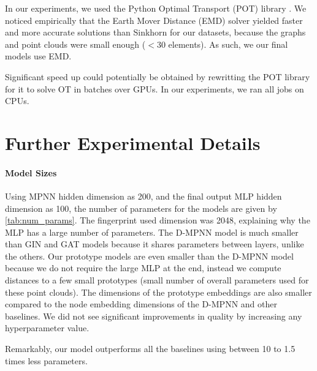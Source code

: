 \documentclass[letterpaper]{article} \usepackage{aaai22}  \usepackage{times}  \usepackage{helvet}  \usepackage{courier}  \usepackage[hyphens]{url}  \usepackage{graphicx} \urlstyle{rm} \def\UrlFont{\rm}  \usepackage{natbib}  \usepackage{caption} \DeclareCaptionStyle{ruled}{labelfont=normalfont,labelsep=colon,strut=off} \frenchspacing  \setlength{\pdfpagewidth}{8.5in}  \setlength{\pdfpageheight}{11in}  \usepackage{algorithm}
\begin{document}
In our experiments, we used the Python Optimal Transport (POT) library \citep{flamary2017pot}. We noticed empirically that the Earth Mover Distance (EMD) solver yielded faster and more accurate solutions than Sinkhorn for our datasets, because the graphs and point clouds were small enough ($< 30$ elements). As such, we our final models use EMD.

Significant speed up could potentially be obtained by rewritting the POT library for it to solve OT in batches over GPUs. In our experiments, we ran all jobs on CPUs.

\section{Further Experimental Details}\label{sec:experimental-details}

\paragraph{Model Sizes}

Using MPNN hidden dimension as 200, and the final output MLP hidden dimension as 100, the number of parameters for the models are given by \cref{tab:num_params}. The fingerprint used dimension was 2048, explaining why the MLP has a large number of parameters. The D-MPNN model is much smaller than GIN and GAT models because it shares parameters between layers, unlike the others. Our prototype models are even smaller than the D-MPNN model because we do not require the large MLP at the end, instead we compute distances to a few small prototypes (small number of overall parameters used for these point clouds). The  dimensions of the prototype embeddings are also smaller compared to the node embedding dimensions of the D-MPNN and other baselines. We did not see significant improvements in quality by increasing any hyperparameter value.

Remarkably, our model outperforms all the baselines using between 10 to 1.5 times less parameters.
\end{document}

